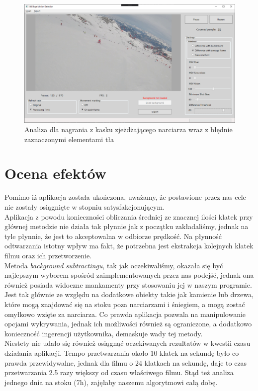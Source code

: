 \documentclass[a4paper]{article}
\begin{document}
\begin{figure}[H]
  \includegraphics[width=\linewidth]{resources/img7.png}
  \caption{Analiza dla nagrania z kasku zjeżdżającego narciarza wraz z błędnie zaznaczonymi elementami tła}
\end{figure}

\section{Ocena efektów}
Pomimo iż aplikacja została ukończona, uważamy, że postawione przez nas cele nie zostały osiągnięte w stopniu satysfakcjonującym.\\
Aplikacja z powodu konieczności obliczania średniej ze znacznej ilości klatek  przy głównej metodzie nie działa tak płynnie jak z początku zakładaliśmy, jednak na tyle płynnie, że jest to akceptowalna w odbiorze prędkość. Na płynność odtwarzania istotny wpływ ma fakt, że potrzebna jest ekstrakcja kolejnych klatek filmu oraz ich przetworzenie.\\
Metoda \textit{background subtractingu}, tak jak oczekiwaliśmy, okazała się  być najlepszym wyborem spośród zaimplementowanych przez nas podejść, jednak ona również posiada widoczne mankamenty przy stosowaniu jej w naszym programie. Jest tak głównie ze względu na dodatkowe obiekty takie jak kamienie lub drzewa, które mogą znajdować się na stoku poza narciarzami i śniegiem, a mogą zostać omyłkowo wzięte za narciarza. Co prawda aplikacja pozwala na manipulowanie opcjami wykrywania, jednak ich możliwości również są ograniczone, a dodatkowo konieczność ingerencji użytkownika, demaskuje wady tej metody.\\
Niestety nie udało się również osiągnąć oczekiwanych rezultatów w kwestii czasu działania aplikacji. Tempo przetwarzania około 10 klatek na sekundę było co prawda przewidywalne, jednak dla filmu o 24 klatkach na sekundę, daje to czas przetwarzania 2.5 razy większy od czasu właściwego filmu. Stąd też analiza jednego dnia na stoku (7h), zajęłaby naszemu algorytmowi całą dobę.
\end{document}
